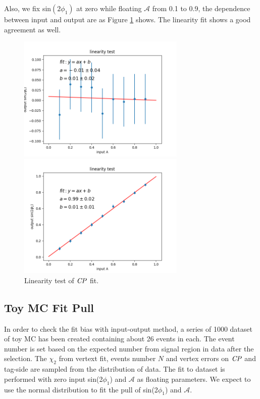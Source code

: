 Also, we fix sin$(2\phi_1)$ at zero while floating $\mathcal{A}$ from  0.1 to 0.9, the dependence between input and output are as Figure \ref{fig:cpfit_line_A} shows. The linearity fit shows a good agreement as well.
\begin{figure}[H]
	\begin{minipage}{0.5\linewidth}
		\includegraphics[height=6cm]{figures/S-test-line_fixS}
	\end{minipage}
	\begin{minipage}{0.5\linewidth}
		\includegraphics[height=6cm]{figures/A-test-line_fixS}
	\end{minipage}
	\caption{Linearity test of $\it{CP}$ fit.}
	\label{fig:cpfit_line_A}
\end{figure}

\subsection{Toy MC Fit Pull}
In order to check the fit bias with input-output method, a series of 1000 dataset of toy MC has been created containing about 26 events in each. The event number is set based on the expected number from signal region in data after the selection. The $\chi_2$ from vertext fit, events number $N$ and vertex errors on $\it{CP}$ and tag-side are sampled from the distribution of data. The fit to dataset is performed with zero input sin(2$\phi_1$) and $\mathcal{A}$ as floating parameters.
We expect to use the normal distribution to fit the pull of sin(2$\phi_1$) and $\mathcal{A}$. 

